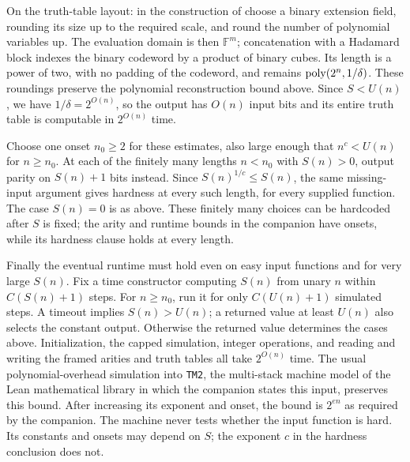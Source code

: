On the truth-table layout: in the construction of
\cite[Lemmas~25 and~28]{STV01} choose a binary extension field,
rounding its size up to the required scale, and round the number
of polynomial variables up. The evaluation domain is then
\(\mathbb F^m\); concatenation with a Hadamard block indexes the
binary codeword by a product of binary cubes. Its length is a
power of two, with no padding of the codeword, and remains
\(\operatorname{poly}(2^n,1/\delta)\). These roundings preserve the polynomial
reconstruction bound above. Since \(S<U(n)\), we have
\(1/\delta=2^{O(n)}\), so the output has \(O(n)\) input bits and
its entire truth table is computable in \(2^{O(n)}\) time.

Choose one onset \(n_0\ge2\) for these estimates, also large enough
that \(n^c<U(n)\) for \(n\ge n_0\). At each of the finitely many
lengths \(n<n_0\) with \(S(n)>0\), output parity on \(S(n)+1\)
bits instead. Since \(S(n)^{1/c}\le S(n)\), the same missing-input
argument gives hardness at every such length, for every supplied
function. The case \(S(n)=0\) is as above. These finitely many
choices can be hardcoded after \(S\) is fixed; the arity and
runtime bounds in the companion have onsets, while its hardness
clause holds at every length.

Finally the eventual runtime must hold even on easy input
functions and for very large \(S(n)\). Fix a time constructor
computing \(S(n)\) from unary \(n\) within \(C(S(n)+1)\) steps.
For \(n\ge n_0\), run it for only \(C(U(n)+1)\) simulated steps.
A timeout implies \(S(n)>U(n)\); a returned value at least \(U(n)\)
also selects the constant output. Otherwise the returned value
determines the cases above. Initialization, the capped simulation,
integer operations, and reading and writing the framed arities
and truth tables all take \(2^{O(n)}\) time. The usual
polynomial-overhead simulation into \texttt{TM2}, the multi-stack
machine model of the Lean mathematical library in which the companion
states this input, preserves this bound.
After increasing its exponent and onset, the bound is
\(2^{en}\) as required by the companion. The machine never tests
whether the input function is hard. Its constants and onsets may
depend on \(S\); the exponent \(c\) in the hardness conclusion
does not.

